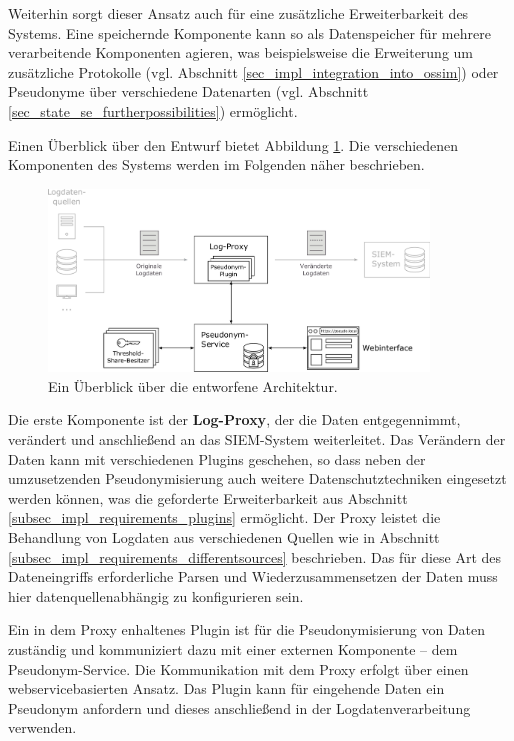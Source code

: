 Weiterhin sorgt dieser Ansatz auch für eine zusätzliche Erweiterbarkeit des Systems. Eine speichernde Komponente kann so als Datenspeicher für mehrere verarbeitende Komponenten agieren, was beispielsweise die Erweiterung um zusätzliche Protokolle (vgl. Abschnitt \ref{sec_impl_integration_into_ossim}) oder Pseudonyme über verschiedene Datenarten (vgl. Abschnitt \ref{sec_state_se_furtherpossibilities}) ermöglicht.

Einen Überblick über den Entwurf bietet Abbildung \ref{fig:high__level_architecture}. Die verschiedenen Komponenten des Systems werden im Folgenden näher beschrieben.

\begin{figure}[]
    \centering
        \includegraphics[width=0.9\textwidth]{dia/high_level_architecture.pdf}
    \caption{Ein Überblick über die entworfene Architektur.}
    \label{fig:high__level_architecture}
\end{figure}

Die erste Komponente ist der \textbf{Log-Proxy}, der die Daten entgegennimmt, verändert und anschließend an das SIEM-System weiterleitet. Das Verändern der Daten kann mit verschiedenen Plugins geschehen, so dass neben der umzusetzenden Pseudonymisierung auch weitere Datenschutztechniken eingesetzt werden können, was die geforderte Erweiterbarkeit aus Abschnitt \ref{subsec_impl_requirements_plugins} ermöglicht. Der Proxy leistet die Behandlung von Logdaten aus verschiedenen Quellen wie in Abschnitt \ref{subsec_impl_requirements_differentsources} beschrieben. Das für diese Art des Dateneingriffs erforderliche Parsen und Wiederzusammensetzen der Daten muss hier datenquellenabhängig zu konfigurieren sein.

Ein in dem Proxy enhaltenes Plugin ist für die Pseudonymisierung von Daten zuständig und kommuniziert dazu mit einer externen Komponente -- dem Pseudonym-Service. Die Kommunikation mit dem Proxy erfolgt über einen webservicebasierten Ansatz. Das Plugin kann für eingehende Daten ein Pseudonym anfordern und dieses anschließend in der Logdatenverarbeitung verwenden.

